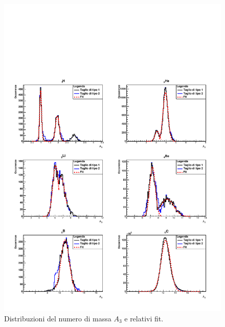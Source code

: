 \documentclass[12pt,a4paper,twoside]{report}
\begin{document}
	\begin{figure}[H]
		\centering
		\includegraphics[width=1.03\linewidth,center]{c_Total_black_blue3.pdf}
		\caption{Distribuzioni del numero di massa $A_3$ e relativi fit.}
		\label{fig:a3_fragments_final}
	\end{figure}
\end{document}
